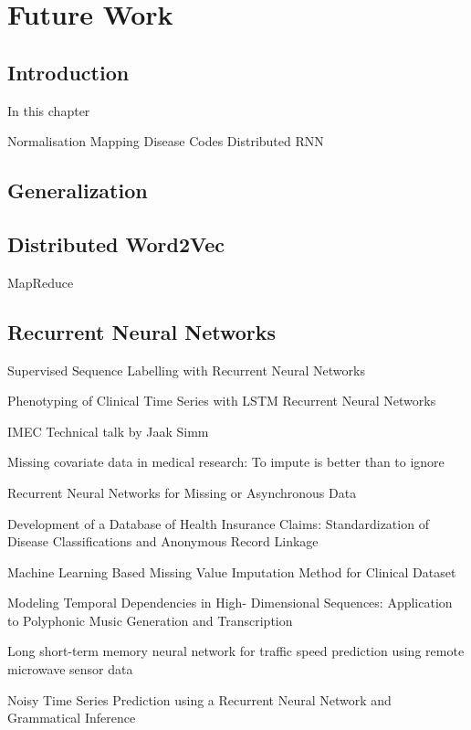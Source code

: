 \graphicspath{ {FutureWork/Images/} }


\chapter{Future Work}
\label{cha:futureWork}

\section{Introduction}
In this chapter 

Normalisation
Mapping Disease Codes
Distributed
RNN


\section{Generalization}




\section{Distributed Word2Vec}

MapReduce


\section{Recurrent Neural Networks}



Supervised Sequence Labelling with Recurrent Neural
Networks

Phenotyping of Clinical Time Series with LSTM
Recurrent Neural Networks

IMEC Technical talk by Jaak Simm

Missing covariate data in medical research: To impute
is better than to ignore


Recurrent Neural Networks for Missing or
Asynchronous Data

Development of a Database of Health Insurance
Claims: Standardization of Disease Classifications and
Anonymous Record Linkage

Machine Learning Based Missing Value Imputation
Method for Clinical Dataset

Modeling Temporal Dependencies in High-
Dimensional Sequences: Application to Polyphonic
Music Generation and Transcription

Long short-term memory neural network for traffic
speed prediction using remote microwave sensor data


Noisy Time Series Prediction using a Recurrent Neural
Network and Grammatical Inference


